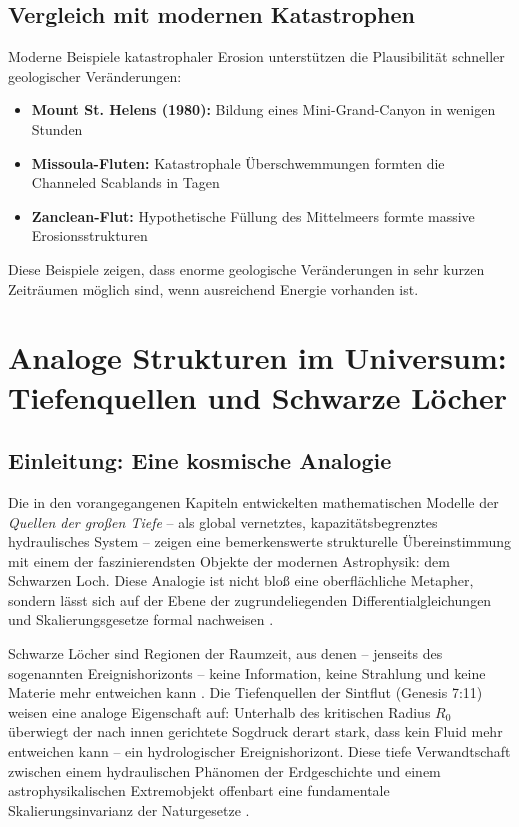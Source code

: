 ﻿\documentclass[12pt,a4paper]{report}
\begin{document}
\section{Vergleich mit modernen Katastrophen}

Moderne Beispiele katastrophaler Erosion unterstützen die Plausibilität schneller geologischer Veränderungen:

\begin{itemize}
	\item \textbf{Mount St. Helens (1980):} Bildung eines Mini-Grand-Canyon in wenigen Stunden
	\item \textbf{Missoula-Fluten:} Katastrophale Überschwemmungen formten die Channeled Scablands in Tagen
	\item \textbf{Zanclean-Flut:} Hypothetische Füllung des Mittelmeers formte massive Erosionsstrukturen
\end{itemize}

Diese Beispiele zeigen, dass enorme geologische Veränderungen in sehr kurzen Zeit\-räumen möglich sind, wenn ausreichend Energie vorhanden ist.

\chapter{Analoge Strukturen im Universum: Tiefenquellen und Schwarze Löcher}
\label{sec:schwarze_loecher}

\section{Einleitung: Eine kosmische Analogie}

Die in den vorangegangenen Kapiteln entwickelten mathematischen Modelle der \textit{Quellen der großen Tiefe} -- als global vernetztes, kapazitätsbegrenztes hydraulisches System -- zeigen eine bemerkenswerte strukturelle Übereinstimmung mit einem der faszinierendsten Objekte der modernen Astrophysik: dem Schwarzen Loch. Diese Analogie ist nicht bloß eine oberflächliche Metapher, sondern lässt sich auf der Ebene der zugrundeliegenden Differentialgleichungen und Skalierungsgesetze formal nachweisen \cite{misner1973,penrose2004}.

Schwarze Löcher sind Regionen der Raumzeit, aus denen -- jenseits des sogenannten Ereignishorizonts -- keine Information, keine Strahlung und keine Materie mehr entweichen kann \cite{schwarzschild1916,hawking1975}. Die Tiefenquellen der Sintflut (Genesis 7:11) weisen eine analoge Eigenschaft auf: Unterhalb des kritischen Radius $R_0$ überwiegt der nach innen gerichtete Sogdruck derart stark, dass kein Fluid mehr entweichen kann -- ein hydrologischer Ereignishorizont. Diese tiefe Verwandtschaft zwischen einem hydraulischen Phänomen der Erdgeschichte und einem astrophysikalischen Extremobjekt offenbart eine fundamentale Skalierungsinvarianz der Naturgesetze \cite{penrose1965,lamb1932}.
\end{document}
